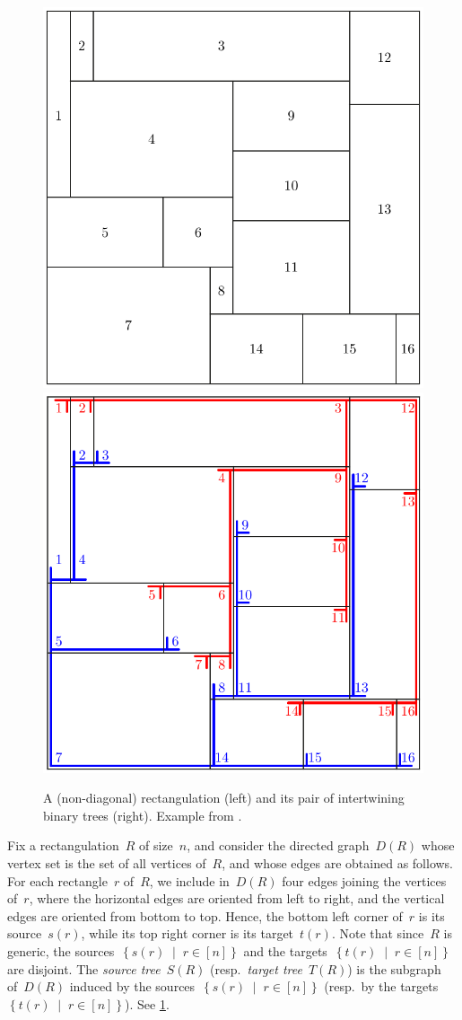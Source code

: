 \documentclass{amsart}
\theoremstyle{definition}
\newcommand{\set}[2]{\left\{ #1 \;\middle|\; #2 \right\}} %
\newcommand{\darkblue}{\color{darkblue}} %
\newcommand{\defn}[1]{\textsl{\darkblue #1}} %
\begin{document}
\begin{figure}
	\centerline{\includegraphics[width=.5\textwidth]{strongRectangulation} \qquad \includegraphics[width=.5\textwidth]{strongRectangulationTrees}}
	\caption{A (non-diagonal) rectangulation (left) and its pair of intertwining binary trees (right). Example from \cite{ACFF24}.}
        \label{fig:strongRectangulation}
\end{figure}

Fix a rectangulation~$R$ of size~$n$, and consider the directed graph~$D(R)$ whose vertex set is the set of all vertices of~$R$, and whose edges are obtained as follows.
For each rectangle~$r$ of~$R$, we include in~$D(R)$ four edges joining the vertices of~$r$, where the horizontal edges are oriented from left to right, and the vertical edges are oriented from bottom to top.
Hence, the bottom left corner of~$r$ is its source~$s(r)$, while its top right corner is its target~$t(r)$.
Note that since~$R$ is generic, the sources~$\set{s(r)}{r \in [n]}$ and the targets~$\set{t(r)}{r \in [n]}$ are disjoint.
The \defn{source tree}~$S(R)$ (resp.~\defn{target tree}~$T(R)$) is the subgraph of~$D(R)$ induced by the sources~$\set{s(r)}{r \in [n]}$ (resp.~by the targets~$\set{t(r)}{r \in [n]}$).
See \cref{fig:strongRectangulation}.
\end{document}
